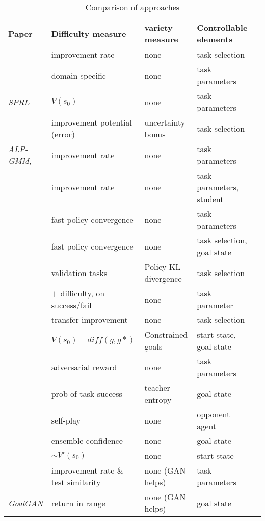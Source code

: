 \documentclass[letterpaper]{article}
\theoremstyle{definition}
\begin{document}
\begin{table*}
\caption{Comparison of approaches}
\begin{tabular}{|l | l | l | l  | l|}
	\hline
	Paper & Difficulty measure & variety measure  & Controllable elements     \\ \hline	
	\cite{Matiisen2020} & improvement rate & none & task selection  \\ \hline
	\cite{Feng2020} & domain-specific & none & task parameters  \\ \hline
	\textit{SPRL} \cite{Klink2020} & $V(s_0)$ & none & task parameters \\ \hline
	\cite{Jiang2020} & improvement potential (error) & uncertainty bonus & task selection  \\ \hline
	\textit{ALP-GMM}, \cite{Portelas2019} &  improvement rate & none & task parameters \\ \hline
	\cite{Portelas2020} & improvement rate & none & task parameters, student  \\ \hline
	\cite{Narvekar2019} & fast policy convergence & none & task parameters \\ \hline
	\cite{Narvekar2020} & fast policy convergence & none & task selection, goal state \\ \hline
	\cite{Gutierrez2020} & validation tasks & Policy KL-divergence & task selection \\ \hline
	\cite{Justesen2018} & $\pm$ difficulty, on success/fail & none & task parameter \\ \hline
	\cite{Jain2017} & transfer improvement & none & task selection \\ \hline
	\cite{Reny2019} & $V(s_0)-diff(g,g*)$ & Constrained goals & start state, goal state \\ \hline
	\cite{Dennis2020} & adversarial reward & none & task parameters \\ \hline
	\cite{Racaniere2019} & prob of task success & teacher entropy & goal state \\ \hline
	\cite{Al-Shedivat2017} & self-play & none & opponent agent \\ \hline
	\cite{Zhang2020} & ensemble confidence & none & goal state \\ \hline
	\cite{Wohlke2020} & $\sim V'(s_0)$ & none & start state \\ \hline
	\cite{Fang2020} & improvement rate \& test similarity & none (GAN helps) & task parameters \\ \hline
	\textit{GoalGAN} \cite{Florensa2018} & return in range & none (GAN helps) & goal state \\ \hline

\end{tabular}
\end{table*}
\end{document}
